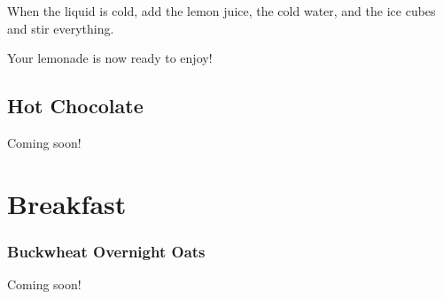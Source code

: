 When the liquid is cold, add the lemon juice, the cold water, and the ice cubes 
and stir everything. 
	
	
Your lemonade is now ready to enjoy!
	
\subsection{Hot Chocolate}
Coming soon!
	
\section{Breakfast}
\subsubsection{Buckwheat Overnight Oats}
Coming soon!
	
% 